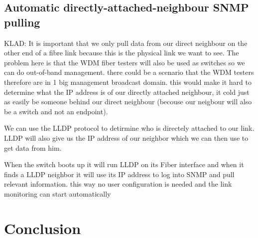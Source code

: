 \documentclass{article}
\begin{document}
\subsection{Automatic directly-attached-neighbour SNMP pulling}
KLAD:
It is important that we only pull data from our direct neighbour on the other end of a fibre link because this is the physical link we want to see. The problem here is that the WDM fiber testers will also be used as switches so we can do out-of-band management. there could be a scenario that the WDM testers therefore are in 1 big management broadcast domain. this would make it hard to determine what the IP address is of our directly attached neighbour, it cold just as easily be someone behind our direct neighbour (becouse our neigbour will also be a switch and not an endpoint).

We can use the LLDP protocol to detirmine who is directely attached to our link. LLDP will also give us the IP address of our neighbor which we can then use to get data from him.

When the switch boots up it will run LLDP on its Fiber interface and when it finds a LLDP neighbor it will use its IP address to log into SNMP and pull relevant information. this way no user configuration is needed and the link monitoring can start automatically

\newpage
\section{Conclusion}


\end{document}
